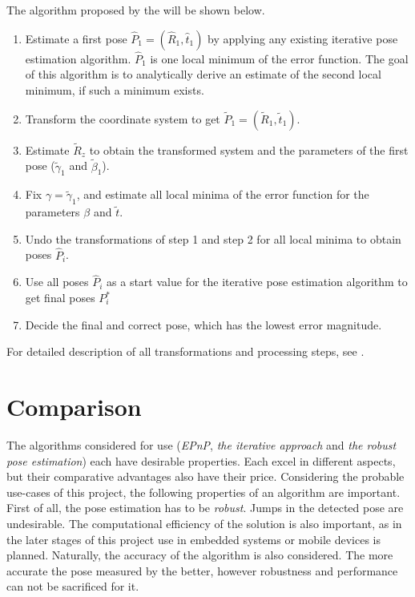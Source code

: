 The algorithm proposed by the \cite{robust} will be shown below.
\begin{enumerate}
	\item Estimate a first pose $\hat{P}_1 = (\hat{R}_1, \hat{t}_1)$ by applying any existing iterative pose estimation algorithm. $\hat{P}_1$ is one local minimum of the error function. The goal of this algorithm is to analytically derive an estimate of the second local minimum, if such a minimum exists.
	\item Transform the coordinate system to get $\tilde{P}_1 = (\tilde{R}_1, \tilde{t}_1)$.
	\item Estimate $\tilde{R}_z$ to obtain the transformed system and the parameters of the first pose ($\tilde{\gamma}_1$ and $\tilde{\beta}_1$).
	\item Fix $\gamma = \tilde{\gamma}_1$, and estimate all local minima of the error function for the parameters $\beta$ and $\tilde{t}$.
	\item Undo the transformations of step 1 and step 2 for all local minima to obtain poses $\hat{P}_i$.
	\item Use all poses $\hat{P}_i$ as a start value for the iterative pose estimation algorithm to get final poses $P_i^*$
	\item Decide the final and correct pose, which has the lowest error magnitude.
\end{enumerate}

For detailed description of all transformations and processing steps, see \cite{robust}.

\section{Comparison}

The algorithms considered for use (\textit{EPnP}, \textit{the iterative approach} and \textit{the robust pose estimation}) each have desirable properties.
Each excel in different aspects, but their comparative advantages also have their price.
Considering the probable use-cases of this project, the following properties of an algorithm are important.
First of all, the pose estimation has to be \textit{robust}.
Jumps in the detected pose are undesirable.
The computational efficiency of the solution is also important, as in the later stages of this project use in embedded systems or mobile devices is planned.
Naturally, the accuracy of the algorithm is also considered.
The more accurate the pose measured by the better, however robustness and performance can not be sacrificed for it.

